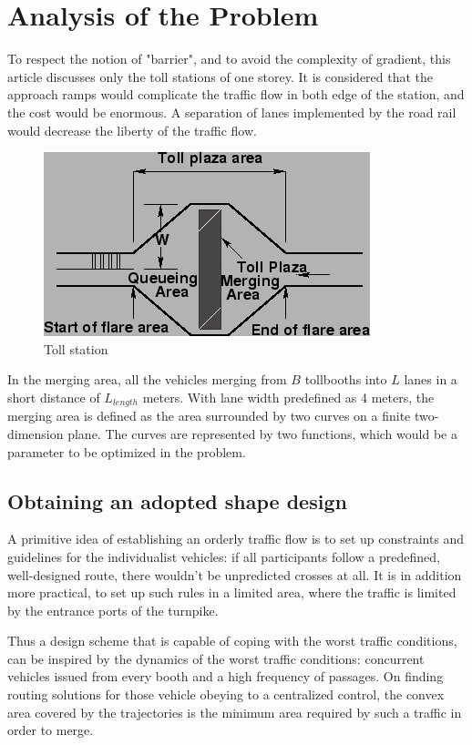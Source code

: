 \documentclass{mcmthesis}
\begin{document}
\section{Analysis of the Problem}

To respect the notion of "barrier", and to avoid the complexity of gradient, this article discusses only the toll stations of one storey. It is considered that the approach ramps would complicate the traffic flow in both edge of the station, and the cost would be enormous. A separation of lanes implemented by the road rail would decrease the liberty of the traffic flow.

\begin{figure}[H]
	\small
	\centering	
	\includegraphics{img3.png}
	\caption{Toll station \cite{note}} \label{fig:Ts}
\end{figure}

In the merging area, all the vehicles merging from $B$ tollbooths into $L$ lanes in a short distance of $L_{length}$ meters.
With lane width predefined as 4 meters, the merging area is defined as the area surrounded by two curves on a finite two-dimension plane. The curves are represented by two functions, which would be a parameter to be optimized in the problem.

\subsection{Obtaining an adopted shape design}

A primitive idea of establishing an orderly traffic flow is to set up constraints and guidelines for the individualist vehicles: if all participants follow a predefined, well-designed route, there wouldn't be unpredicted crosses at all. It is in addition more practical, to set up such rules in a limited area, where the traffic is limited by the entrance ports of the turnpike.

Thus a design scheme that is capable of coping with the worst traffic conditions, can be inspired by the dynamics of the worst traffic conditions: concurrent vehicles issued from every booth and a high frequency of passages. On finding routing solutions for those vehicle obeying to a centralized control, the convex area covered by the trajectories is the minimum area required by such a traffic in order to merge.
\end{document}
